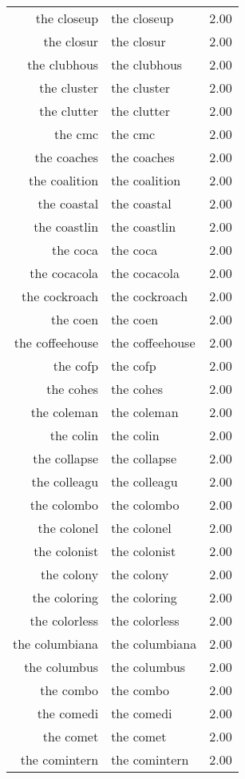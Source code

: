 \begin{table}[ht]
\begin{tabular}{rlr}
  the closeup & the closeup & 2.00 \\ 
  the closur & the closur & 2.00 \\ 
  the clubhous & the clubhous & 2.00 \\ 
  the cluster & the cluster & 2.00 \\ 
  the clutter & the clutter & 2.00 \\ 
  the cmc & the cmc & 2.00 \\ 
  the coaches & the coaches & 2.00 \\ 
  the coalition & the coalition & 2.00 \\ 
  the coastal & the coastal & 2.00 \\ 
  the coastlin & the coastlin & 2.00 \\ 
  the coca & the coca & 2.00 \\ 
  the cocacola & the cocacola & 2.00 \\ 
  the cockroach & the cockroach & 2.00 \\ 
  the coen & the coen & 2.00 \\ 
  the coffeehouse & the coffeehouse & 2.00 \\ 
  the cofp & the cofp & 2.00 \\ 
  the cohes & the cohes & 2.00 \\ 
  the coleman & the coleman & 2.00 \\ 
  the colin & the colin & 2.00 \\ 
  the collapse & the collapse & 2.00 \\ 
  the colleagu & the colleagu & 2.00 \\ 
  the colombo & the colombo & 2.00 \\ 
  the colonel & the colonel & 2.00 \\ 
  the colonist & the colonist & 2.00 \\ 
  the colony & the colony & 2.00 \\ 
  the coloring & the coloring & 2.00 \\ 
  the colorless & the colorless & 2.00 \\ 
  the columbiana & the columbiana & 2.00 \\ 
  the columbus & the columbus & 2.00 \\ 
  the combo & the combo & 2.00 \\ 
  the comedi & the comedi & 2.00 \\ 
  the comet & the comet & 2.00 \\ 
  the comintern & the comintern & 2.00 \\ 

\end{tabular}
\end{table}
